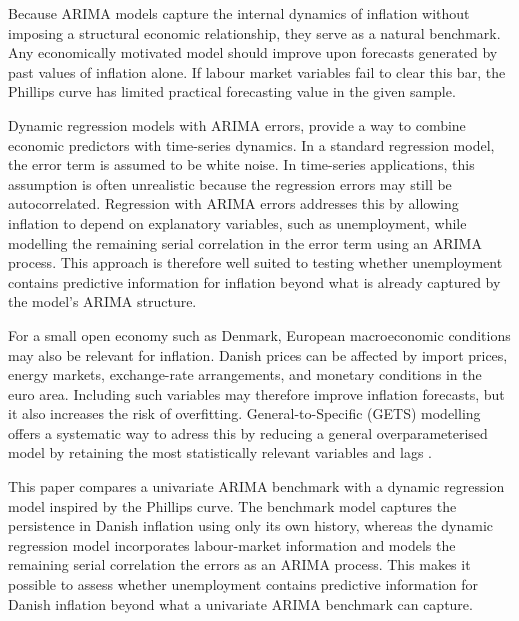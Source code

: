 
Because ARIMA models capture the internal dynamics of inflation without imposing a structural economic relationship, they serve as a natural benchmark. Any economically motivated model should improve upon forecasts generated by past values of inflation alone. If labour market variables fail to clear this bar, the Phillips curve has limited practical forecasting value in the given sample.

Dynamic regression models with ARIMA errors, provide a way to combine economic predictors with time-series dynamics. In a standard regression model, the error term is assumed to be white noise. In time-series applications, this assumption is often unrealistic because the regression errors may still be autocorrelated. Regression with ARIMA errors addresses this by allowing inflation to depend on explanatory variables, such as unemployment, while modelling the remaining serial correlation in the error term using an ARIMA process. This approach is therefore well suited to testing whether unemployment contains predictive information for inflation beyond what is already captured by the model's ARIMA structure.

For a small open economy such as Denmark, European macroeconomic conditions may also be relevant for inflation. Danish prices can be affected by import prices, energy markets, exchange-rate arrangements, and monetary conditions in the euro area. Including such variables may therefore improve inflation forecasts, but it also increases the risk of overfitting. General-to-Specific (GETS) modelling offers a systematic way to adress this by reducing a general overparameterised model by retaining the most statistically relevant variables and lags \parencite{doornik2014}.

This paper compares a univariate ARIMA benchmark with a dynamic regression model inspired by the Phillips curve. The benchmark model captures the persistence in Danish inflation using only its own history, whereas the dynamic regression model incorporates labour-market information and models the remaining serial correlation the errors as an ARIMA process. This makes it possible to assess whether unemployment contains predictive information for Danish inflation beyond what a univariate ARIMA benchmark can capture.